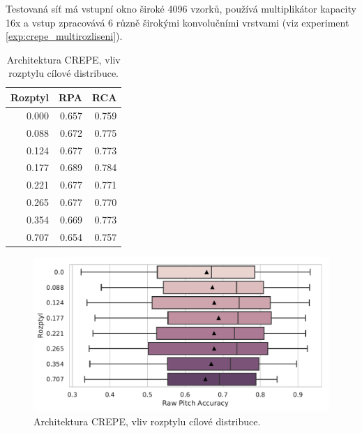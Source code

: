 
Testovaná síť má vstupní okno široké 4096 vzorků, používá multiplikátor kapacity 16x a vstup zpracovává 6 různě širokými konvolučními vrstvami (viz experiment \ref{exp:crepe_multirozliseni}).


\begin{table}[h!]
\centering
    \begin{tabular}{rrr}
    \toprule
    Rozptyl &   RPA &   RCA \\
    \midrule
    0.000 & 0.657 & 0.759 \\
    0.088 & 0.672 & 0.775 \\
    0.124 & 0.677 & 0.773 \\
    0.177 & 0.689 & 0.784 \\
    0.221 & 0.677 & 0.771 \\
    0.265 & 0.677 & 0.770 \\
    0.354 & 0.669 & 0.773 \\
    0.707 & 0.654 & 0.757 \\
    \bottomrule
    \end{tabular}

\caption{Architektura CREPE, vliv rozptylu cílové distribuce.}\label{tab:crepe_diskretizace}
\end{table}

\begin{figure}[h]\centering
    \includegraphics[scale=0.6]{../img/figures/crepe_rozptyl.pdf}
\caption{Architektura CREPE, vliv rozptylu cílové distribuce.}\label{obr:crepe_diskretizace}
\end{figure}

